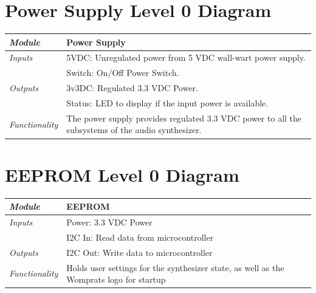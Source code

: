 \documentclass{article}
\begin{document}
\section{Power Supply Level 0 Diagram}

\begin{tabular}{|p{1in}|p{5in}|}
\hline
\emph{Module} & Power Supply \\
\hline
\emph{Inputs}& 5VDC: Unregulated power from 5 VDC wall-wart power supply.\\
	     & Switch: On/Off Power Switch.\\
\hline
\emph{Outputs}& 3v3DC: Regulated 3.3 VDC Power.\\
	      & Status: LED to display if the input power is available.\\ 
\hline
\emph{Functionality}& The power supply provides regulated 3.3 VDC power to all the subsystems of the audio synthesizer.\\
\hline
\end{tabular}

\section{EEPROM Level 0 Diagram}

\begin{tabular}{|p{1in}|p{5in}|}
\hline
\emph{Module} & EEPROM \\
\hline
\emph{Inputs}& Power: 3.3 VDC Power\\
	     & I2C In: Read data from microcontroller \\
\hline
\emph{Outputs}& I2C Out: Write data to microcontroller \\ 
\hline
\emph{Functionality}& Holds user settings for the synthesizer state, as well as the Womprats logo for startup\\
\hline
\end{tabular}
\end{document}

